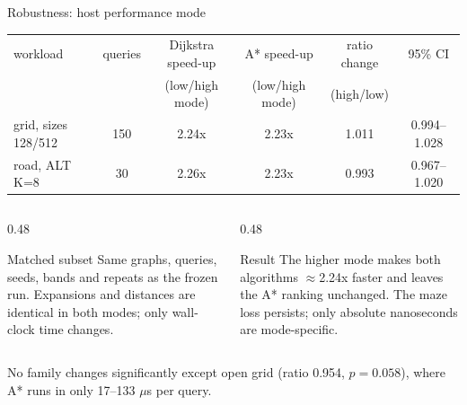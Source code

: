 \documentclass[aspectratio=169,10pt]{beamer}
\begin{document}
\begin{frame}{Robustness: host performance mode}
  \centering
  \small
  \begin{tabular}{lccccc}
    \toprule
    workload & queries & Dijkstra speed-up & A* speed-up & ratio change & 95\% CI\\
             &         & (low/high mode)   & (low/high mode) & (high/low) & \\
    \midrule
    grid, sizes 128/512 & 150 & 2.24x & 2.23x & 1.011 & 0.994--1.028\\
    road, ALT K=8       & 30  & 2.26x & 2.23x & 0.993 & 0.967--1.020\\
    \bottomrule
  \end{tabular}

  \vspace{1.1em}
  \begin{columns}[T,onlytextwidth]
    \begin{column}{0.48\textwidth}
      \begin{block}{Matched subset}
        \footnotesize
        Same graphs, queries, seeds, bands and repeats as the frozen run.
        Expansions and distances are identical in both modes; only wall-clock
        time changes.
      \end{block}
    \end{column}
    \begin{column}{0.48\textwidth}
      \begin{block}{Result}
        \footnotesize
        The higher mode makes both algorithms $\approx$2.24x faster and leaves
        the A* ranking unchanged.  The maze loss persists; only absolute
        nanoseconds are mode-specific.
      \end{block}
    \end{column}
  \end{columns}

  \vspace{0.5em}
  \footnotesize
  No family changes significantly except open grid (ratio 0.954, $p=0.058$),
  where A* runs in only 17--133 $\mu$s per query.
\end{frame}
\end{document}
